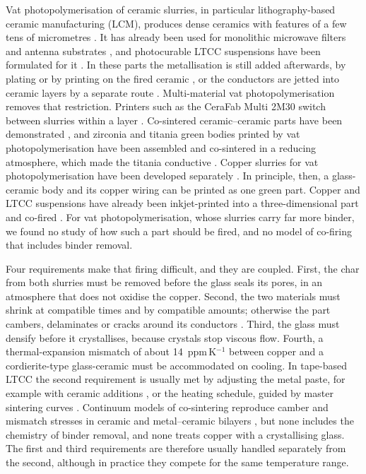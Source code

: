 Vat photopolymerisation of ceramic slurries, in particular lithography-based ceramic manufacturing (LCM), produces dense ceramics with features of a few tens of micrometres \cite{schwentenwein2015additive,stampfl2023lithography,halloran2016ceramic}. It has already been used for monolithic microwave filters and antenna substrates \cite{qian2022printed,fontana2023novel,mazingue2021printed}, and photocurable LTCC suspensions have been formulated for it \cite{fernandes2021study}. In these parts the metallisation is still added afterwards, by plating or by printing on the fired ceramic \cite{qian2022printed,wang2026fabrication}, or the conductors are jetted into ceramic layers by a separate route \cite{hirao2019novel,jager2024inkjet,liang2023additive,duan2023costeffective}. Multi-material vat photopolymerisation removes that restriction. Printers such as the CeraFab Multi 2M30 switch between slurries within a layer \cite{geier2020multimaterial,xu2026vat,subedi2024multimaterial}. Co-sintered ceramic--ceramic parts have been demonstrated \cite{schlacher2024towards}, and zirconia and titania green bodies printed by vat photopolymerisation have been assembled and co-sintered in a reducing atmosphere, which made the titania conductive \cite{schwarzerfischer2021combining}. Copper slurries for vat photopolymerisation have been developed separately \cite{roumanie2021influence,scheibler2024lithography,resch2023lithography,canocano2024recent}. In principle, then, a glass-ceramic body and its copper wiring can be printed as one green part. Copper and LTCC suspensions have already been inkjet-printed into a three-dimensional part and co-fired \cite{hirao2019novel}. For vat photopolymerisation, whose slurries carry far more binder, we found no study of how such a part should be fired, and no model of co-firing that includes binder removal.

Four requirements make that firing difficult, and they are coupled. First, the char from both slurries must be removed before the glass seals its pores, in an atmosphere that does not oxidise the copper. Second, the two materials must shrink at compatible times and by compatible amounts; otherwise the part cambers, delaminates or cracks around its conductors \cite{cai1997constrainedI,green2008constrained,jean1997cofiring}. Third, the glass must densify before it crystallises, because crystals stop viscous flow. Fourth, a thermal-expansion mismatch of about 14~ppm\,K$^{-1}$ between copper and a cordierite-type glass-ceramic must be accommodated on cooling. In tape-based LTCC the second requirement is usually met by adjusting the metal paste, for example with ceramic additions \cite{chang1998effects}, or the heating schedule, guided by master sintering curves \cite{brandt2013improved}. Continuum models of co-sintering reproduce camber and mismatch stresses in ceramic and metal--ceramic bilayers \cite{olevsky2013sintering,molla2014finite,kanters2001cosintering,reiterer2006arrhenius,chretien2022distortion,antou2024cosintering}, but none includes the chemistry of binder removal, and none treats copper with a crystallising glass. The first and third requirements are therefore usually handled separately from the second, although in practice they compete for the same temperature range.

